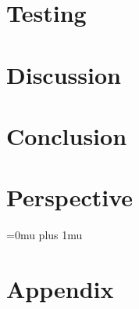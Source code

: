 























\clearpage
\chapter{Testing}\label{ch:testing}


\clearpage
\chapter{Discussion}\label{ch:discussion}



\clearpage
\chapter{Conclusion}\label{ch:conclusion}



\clearpage
\chapter{Perspective}\label{ch:perspective}



\clearpage
\Urlmuskip=0mu plus 1mu\relax
\sloppy

{}

\chapter{Appendix}\label{ch:appendix}



